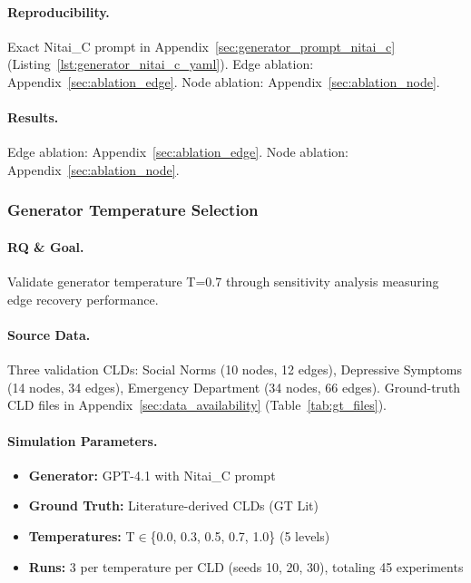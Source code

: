 \paragraph{Reproducibility.}
Exact Nitai\_C prompt in Appendix~\ref{sec:generator_prompt_nitai_c} (Listing~\ref{lst:generator_nitai_c_yaml}). Edge ablation: Appendix~\ref{sec:ablation_edge}. Node ablation: Appendix~\ref{sec:ablation_node}.

\paragraph{Results.}
Edge ablation: Appendix~\ref{sec:ablation_edge}. Node ablation: Appendix~\ref{sec:ablation_node}.

\subsubsection{Generator Temperature Selection}
\label{sec:generator_temp_selection}

\paragraph{RQ \& Goal.}
Validate generator temperature T=0.7 through sensitivity analysis measuring edge recovery performance.

\paragraph{Source Data.}
Three validation CLDs: Social Norms (10 nodes, 12 edges), Depressive Symptoms (14 nodes, 34 edges), Emergency Department (34 nodes, 66 edges).
Ground-truth CLD files in Appendix~\ref{sec:data_availability} (Table~\ref{tab:gt_files}).

\paragraph{Simulation Parameters.}
\begin{itemize}[noitemsep]
    \item \textbf{Generator:} GPT-4.1 with Nitai\_C prompt
    \item \textbf{Ground Truth:} Literature-derived CLDs (GT Lit)
    \item \textbf{Temperatures:} T$\in$\{0.0, 0.3, 0.5, 0.7, 1.0\} (5 levels)
    \item \textbf{Runs:} 3 per temperature per CLD (seeds 10, 20, 30), totaling 45 experiments
\end{itemize}

